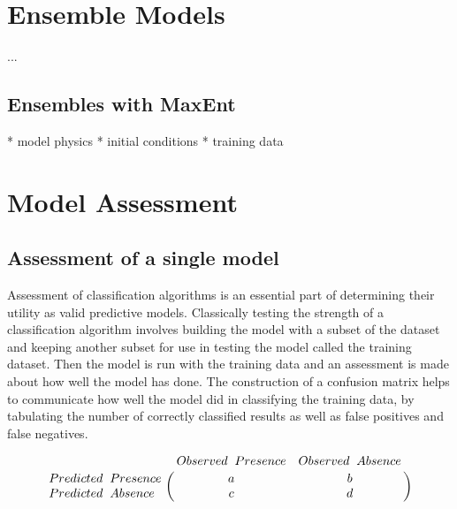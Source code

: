 \section{Ensemble Models}


 ...\newline

\subsection{Ensembles with MaxEnt}
* model physics \newline
* initial conditions\newline
* training data \newline



\section{Model Assessment }

\subsection{Assessment of a single model}

Assessment of classification algorithms is an essential part of determining their utility as valid predictive models. Classically testing the strength of a classification algorithm involves building the model with a subset of the dataset and keeping another subset for use in testing the model called the training dataset. Then the model is run with the training data and an assessment is made about how well the model has done. The construction of a confusion matrix helps to communicate how well the model did in classifying the training data, by tabulating the number of correctly classified results as well as false positives and false negatives. 

\begin{equation} \bordermatrix{~ & Observed \hspace{0.2cm} Presence & Observed \hspace{0.2cm} Absence \cr
                  Predicted\hspace{0.2cm}  Presence & a & b \cr
                  Predicted \hspace{0.2cm} Absence & c & d \cr} \end{equation}
                  
